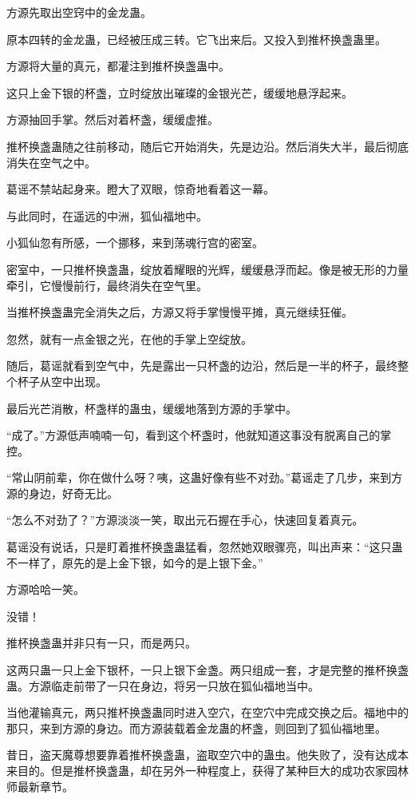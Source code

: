 \begin{this_body}
方源先取出空窍中的金龙蛊。

原本四转的金龙蛊，已经被压成三转。它飞出来后。又投入到推杯换盏蛊里。

方源将大量的真元，都灌注到推杯换盏蛊中。

这只上金下银的杯盏，立时绽放出璀璨的金银光芒，缓缓地悬浮起来。

方源抽回手掌。然后对着杯盏，缓缓虚推。

推杯换盏蛊随之往前移动，随后它开始消失，先是边沿。然后消失大半，最后彻底消失在空气之中。

葛谣不禁站起身来。瞪大了双眼，惊奇地看着这一幕。

与此同时，在遥远的中洲，狐仙福地中。

小狐仙忽有所感，一个挪移，来到荡魂行宫的密室。

密室中，一只推杯换盏蛊，绽放着耀眼的光辉，缓缓悬浮而起。像是被无形的力量牵引，它慢慢前行，最终消失在空气里。

当推杯换盏蛊完全消失之后，方源又将手掌慢慢平摊，真元继续狂催。

忽然，就有一点金银之光，在他的手掌上空绽放。

随后，葛谣就看到空气中，先是露出一只杯盏的边沿，然后是一半的杯子，最终整个杯子从空中出现。

最后光芒消散，杯盏样的蛊虫，缓缓地落到方源的手掌中。

“成了。”方源低声喃喃一句，看到这个杯盏时，他就知道这事没有脱离自己的掌控。

“常山阴前辈，你在做什么呀？咦，这蛊好像有些不对劲。”葛谣走了几步，来到方源的身边，好奇无比。

“怎么不对劲了？”方源淡淡一笑，取出元石握在手心，快速回复着真元。

葛谣没有说话，只是盯着推杯换盏蛊猛看，忽然她双眼骤亮，叫出声来：“这只蛊不一样了，原先的是上金下银，如今的是上银下金。”

方源哈哈一笑。

没错！

推杯换盏蛊并非只有一只，而是两只。

这两只蛊一只上金下银杯，一只上银下金盏。两只组成一套，才是完整的推杯换盏蛊。方源临走前带了一只在身边，将另一只放在狐仙福地当中。

当他灌输真元，两只推杯换盏蛊同时进入空穴，在空穴中完成交换之后。福地中的那只，来到方源的身边。而方源装载着金龙蛊的杯盏，则回到了狐仙福地里。

昔日，盗天魔尊想要靠着推杯换盏蛊，盗取空穴中的蛊虫。他失败了，没有达成本来目的。但是推杯换盏蛊，却在另外一种程度上，获得了某种巨大的成功农家园林师最新章节。


\end{this_body}
